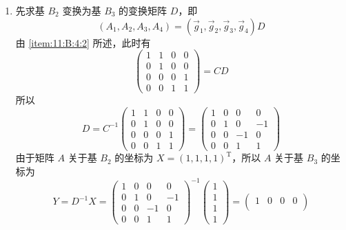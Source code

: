 \begin{enumerate}
\begin{enumerate}
              \item 先求基 $ B_2 $ 变换为基 $ B_3 $ 的变换矩阵 $ D $，即
                    \[ (A_1, A_2, A_3, A_4) = (\vec{g}_1, \vec{g}_2, \vec{g}_3, \vec{g}_4) D \]
                    由 \ref*{item:11:B:4:2} 所述，此时有
                    \[ \begin{pmatrix}
                            1 & 1 & 0 & 0 \\
                            0 & 1 & 0 & 0 \\
                            0 & 0 & 0 & 1 \\
                            0 & 0 & 1 & 1
                        \end{pmatrix} = CD \]
                    所以
                    \[ D = C^{-1} \begin{pmatrix}
                            1 & 1 & 0 & 0 \\
                            0 & 1 & 0 & 0 \\
                            0 & 0 & 0 & 1 \\
                            0 & 0 & 1 & 1
                        \end{pmatrix} = \begin{pmatrix}
                            1 & 0 & 0  & 0  \\
                            0 & 1 & 0  & -1 \\
                            0 & 0 & -1 & 0  \\
                            0 & 0 & 1  & 1
                        \end{pmatrix} \]
                    由于矩阵 $ A $ 关于基 $ B_2 $ 的坐标为 $ X = (1, 1, 1, 1)^{\mathrm{T}} $，所以 $ A $ 关于基 $ B_3 $ 的坐标为
                    \[ Y = D^{-1} X = \begin{pmatrix}
                            1 & 0 & 0  & 0  \\
                            0 & 1 & 0  & -1 \\
                            0 & 0 & -1 & 0  \\
                            0 & 0 & 1  & 1
                        \end{pmatrix}^{-1} \begin{pmatrix} 1 \\ 1 \\ 1 \\ 1 \end{pmatrix} = \begin{pmatrix}
                            1 & 0 & 0  & 0 \\

\end{pmatrix}\]
\end{enumerate}
\end{enumerate}
